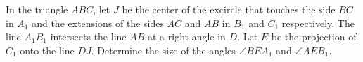 In the triangle $ABC$, let $J$ be the center of the excircle that touches the
side $BC$ in $A_1$ and the extensions of the sides $AC$ and $AB$ in $B_1$ and $C_1$ respectively.
The line $A_1B_1$ intersects the line $AB$ at a right angle in $D$.
Let $E$ be the projection of $C_1$ onto the line $DJ$.
Determine the size of the angles $\angle BEA_1$ and $\angle AEB_1$.
